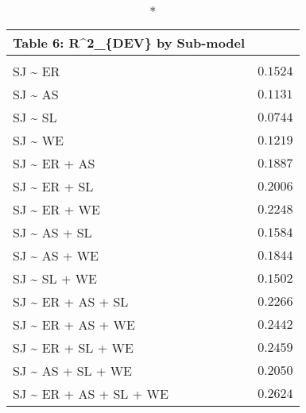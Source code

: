 \begin{longtable}{lr}
\caption*{
{\large Table 6: R\textasciicircum{}2\_\{DEV\} by Sub-model}
} \\ 
\toprule
 &  \\ 
\midrule
SJ \textasciitilde{} ER & $0.1524$ \\ 
SJ \textasciitilde{} AS & $0.1131$ \\ 
SJ \textasciitilde{} SL & $0.0744$ \\ 
SJ \textasciitilde{} WE & $0.1219$ \\ 
SJ \textasciitilde{} ER + AS & $0.1887$ \\ 
SJ \textasciitilde{} ER + SL & $0.2006$ \\ 
SJ \textasciitilde{} ER + WE & $0.2248$ \\ 
SJ \textasciitilde{} AS + SL & $0.1584$ \\ 
SJ \textasciitilde{} AS + WE & $0.1844$ \\ 
SJ \textasciitilde{} SL + WE & $0.1502$ \\ 
SJ \textasciitilde{} ER + AS + SL & $0.2266$ \\ 
SJ \textasciitilde{} ER + AS + WE & $0.2442$ \\ 
SJ \textasciitilde{} ER + SL + WE & $0.2459$ \\ 
SJ \textasciitilde{} AS + SL + WE & $0.2050$ \\ 
SJ \textasciitilde{} ER + AS + SL + WE & $0.2624$ \\ 
\bottomrule
\end{longtable}

